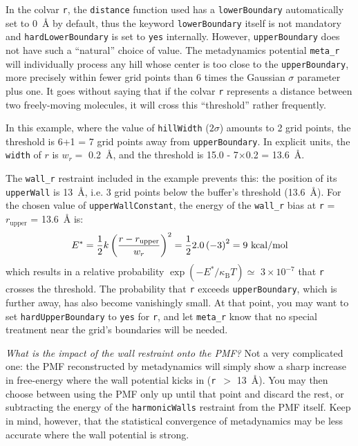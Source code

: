 In the colvar \texttt{r}, the \texttt{distance} function used has a \texttt{lowerBoundary} automatically set to 0~\AA{} by default, thus the keyword \texttt{lowerBoundary} itself is not mandatory and \texttt{hardLowerBoundary} is set to \texttt{yes} internally.
However, \texttt{upperBoundary} does not have such a ``natural'' choice of value.
The metadynamics potential \texttt{meta\_r} will individually process any hill whose center is too close to the \texttt{upperBoundary}, more precisely within fewer grid points than 6 times the Gaussian $\sigma$ parameter plus one.
It goes without saying that if the colvar \texttt{r} represents a distance between two freely-moving molecules, it will cross this ``threshold'' rather frequently.

In this example, where the value of \texttt{hillWidth} ($2\sigma$) amounts to 2 grid points, the threshold is 6+1 = 7 grid points away from \texttt{upperBoundary}.
In explicit units, the \texttt{width} of $r$ is $w_r =$ 0.2~\AA, and the threshold is 15.0 - 7$\times$0.2 = 13.6~\AA.

The \texttt{wall\_r} restraint included in the example prevents this: the position of its \texttt{upperWall} is 13~\AA{}, i.e.{} 3 grid points below the buffer's threshold (13.6~\AA).
For the chosen value of \texttt{upperWallConstant}, the energy of the \texttt{wall\_r} bias at \texttt{r} = $r_{\mathrm{upper}}$ = 13.6~\AA{} is:
\begin{equation*}
  E^* = \frac{1}{2} \- k \left(\frac{r - r_{\mathrm{upper}}}{w_r}\right)^2 = \frac{1}{2} \- 2.0 \left(-3\right)^2 = 9~\mathrm{kcal/mol}
\end{equation*}
which results in a relative probability $\exp(-E^*/\kappa_{\mathrm{B}}T) \simeq$ $3\times{}10^{-7}$ that \texttt{r} crosses the threshold.
The probability that \texttt{r} exceeds \texttt{upperBoundary}, which is further away, has also become vanishingly small.
At that point, you may want to set \texttt{hardUpperBoundary} to \texttt{yes} for \texttt{r}, and let \texttt{meta\_r} know that no special treatment near the grid's boundaries will be needed.

\emph{What is the impact of the wall restraint onto the PMF?} Not a very complicated one: the PMF reconstructed by metadynamics will simply show a sharp increase in free-energy where the wall potential kicks in (\texttt{r}~$>$ 13~\AA{}).
You may then choose between using the PMF only up until that point and discard the rest, or subtracting the energy of the \texttt{harmonicWalls} restraint from the PMF itself.
Keep in mind, however, that the statistical convergence of metadynamics may be less accurate where the wall potential is strong.

